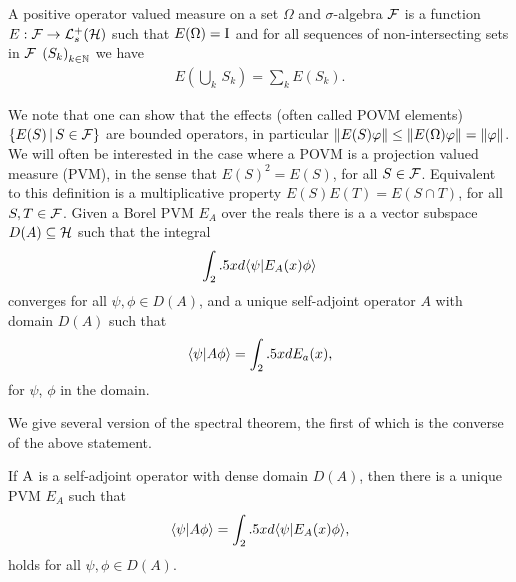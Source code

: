 \begin{defn}\label{defn:povm}
  A positive operator valued measure on a set $\Omega$ and $\sigma$-algebra $\mathcal{F}$ is a function $E:\fcal\to\posops[\hcal]$ such that $E(\Omega) = \operatorname{I}$ and for all sequences of non-intersecting sets in $\mathcal{F}$ $\seq{S_k}[k\in\N]$ we have 
  \begin{align}
    E\left(\bigcup_k \,S_k\right) = \sum_k E(S_k).
  \end{align}
\end{defn}
We note that one can show that the effects (often called POVM elements) $\left\{E(S)\,\middle|\,S\in\mathcal{F}\right\}$ are bounded operators, in particular ${\left\lVert{E(S)\varphi}\right\rVert} \leq {\left\lVert{E(\Omega)\varphi}\right\rVert} = {\left\lVert{\varphi}\right\rVert}$. We will often be interested in the case where a POVM is a projection valued measure (PVM), in the sense that $E(S)^2 = E(S)$, for all $S\in\mathcal{F}$. Equivalent to this definition is a multiplicative property $E(S)E(T) = E(S\cap T)$, for all $S,T\in\mathcal{F}$. Given a Borel PVM $E_A$ over the reals there is a a vector subspace $D(A)\subseteq\mathcal{H}$ such that the integral
\begin{align}
  \int_2.5 x d\langle \psi|E_A(x)\phi\rangle 
\end{align}
converges for all $\psi,\phi\in D(A)$, and a unique self-adjoint operator $A$ with domain $D(A)$ such that 
\begin{align}
  \langle \psi|A\phi\rangle = \int_2.5 x dE_a(x),
\end{align}
for $\psi$, $\phi$ in the domain.

We give several version of the spectral theorem, the first of which is the converse of the above statement.

\begin{thm}
  If $\operatorname{A}$ is a self-adjoint operator with dense domain $D(A)$, then there is a unique PVM $E_A$ such that
  \begin{align}
    \langle \psi|A\phi\rangle = \int_2.5 x d\langle \psi|E_A(x)\phi\rangle,
  \end{align}
  holds for all $\psi,\phi\in D(A)$.
\end{thm}

